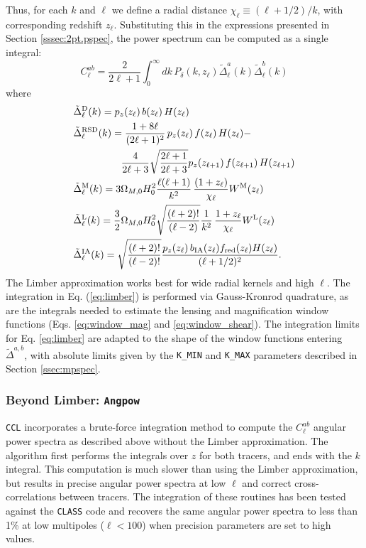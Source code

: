 \documentclass[\docopts]{\docclass}
\newcommand{\ccl}{{\tt CCL}\xspace}
\newcommand{\class}{{\tt CLASS}\xspace}
\begin{document}
Thus, for each $k$ and $\ell$ we define a radial distance $\chi_\ell\equiv(\ell+1/2)/k$, with corresponding redshift $z_\ell$. Substituting this in the expressions presented in Section \ref{sssec:2pt.pspec}, the power spectrum can be computed as a single integral:
\begin{equation}\label{eq:limber}
 C^{ab}_\ell=\frac{2}{2\ell+1}\int_0^\infty dk\,P_\delta\left(k,z_\ell\right)
 \tilde{\Delta}^a_\ell(k)\tilde{\Delta}^b_\ell(k)
\end{equation}
where
\begin{align}
 &\tilde{\Delta}_\ell^{\rm D}(k)=p_z(z_\ell)\,b(z_\ell)\,H(z_\ell)\\
 &\tilde{\Delta}_\ell^{\rm RSD}(k)=
 \frac{1+8\ell}{(2\ell+1)^2}\,p_z(z_\ell)\,f(z_\ell)\,H(z_\ell)-\\\nonumber
 &\hspace{48pt}\frac{4}{2\ell+3}\sqrt{\frac{2\ell+1}{2\ell+3}}p_z(z_{\ell+1})\,f(z_{\ell+1})\,H(z_{\ell+1})\\
 &\tilde{\Delta}_\ell^{\rm M}(k)=3\Omega_{M,0}H_0^2\frac{\ell(\ell+1)}{k^2}\,
 \frac{(1+z_\ell)}{\chi_\ell}W^{\rm M}(z_\ell)\\
 &\tilde{\Delta}_\ell^{\rm L}(k)=\frac{3}{2}\Omega_{M,0}H_0^2\sqrt{\frac{(\ell+2)!}{(\ell-2)}}\frac{1}{k^2}\,
 \frac{1+z_\ell}{\chi_\ell}W^{\rm L}(z_\ell)\\
 &\tilde{\Delta}_\ell^{\rm IA}(k)=\sqrt{\frac{(\ell+2)!}{(\ell-2)!}}\frac{p_z(z_\ell)\,b_{\rm IA}(z_\ell)f_{\rm red}(z_\ell)H(z_\ell)}{(\ell+1/2)^2}.
\end{align}
The Limber approximation works best for wide radial kernels and high $\ell$. The integration in Eq. (\ref{eq:limber}) is performed via Gauss-Kronrod quadrature, as are the integrals needed to estimate the lensing and magnification window functions (Eqs. \ref{eq:window_mag} and \ref{eq:window_shear}). The integration limits for Eq. \ref{eq:limber} are adapted to the shape of the window functions entering $\tilde{\Delta}^{a,b}$, with absolute limits given by the {\tt K\_MIN} and {\tt K\_MAX} parameters described in Section \ref{ssec:mpspec}. 

\subsubsection{Beyond Limber: \texttt{Angpow}}
\label{sec:angpow}

\ccl incorporates a brute-force integration method to compute the $C^{ab}_\ell$ angular power spectra as described above without the Limber approximation. The algorithm first performs the integrals over $z$ for both tracers, and ends with the $k$ integral. This computation is much slower than using the Limber approximation, but results in precise angular power spectra at low $\ell$ and correct cross-correlations between tracers. The integration of these routines has been tested against the \class code and recovers the same angular power spectra to less than 1\% at low multipoles ($\ell<100$) when precision parameters are set to high values.
\end{document}
